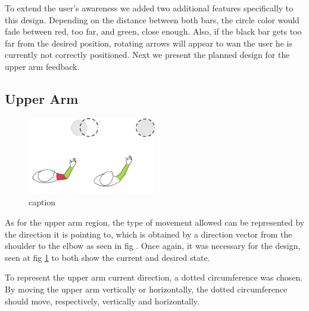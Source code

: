 
To extend the user's awareness we added two additional features specifically to this design. Depending on the distance between both bars, the circle color would fade between red, too far, and green, close enough. Also, if the black bar gets too far from the desired position, rotating arrows will appear to wan the user he is currently not correctly positioned. Next we present the planned design for the upper arm feedback.


\subsection{Upper Arm}

\begin{figure}[!b]
    \begin{center}
        \includegraphics[width=0.5\textwidth]{imgs/upperarmfeedback.png}
    \end{center}
    \caption{caption}
    \label{fig:upperarmfeedback}
\end{figure}

As for the upper arm region, the type of movement allowed can be represented by the direction it is pointing to, which is obtained by a direction vector from the shoulder to the elbow as seen in fig .
Once again, it was necessary for the design, seen at fig \ref{fig:upperarmfeedback} to both show the current and desired state. 


To represent the upper arm current direction, a dotted circumference was chosen. By moving the upper arm vertically or horizontally, the dotted circumference should move, respectively, vertically and horizontally.

